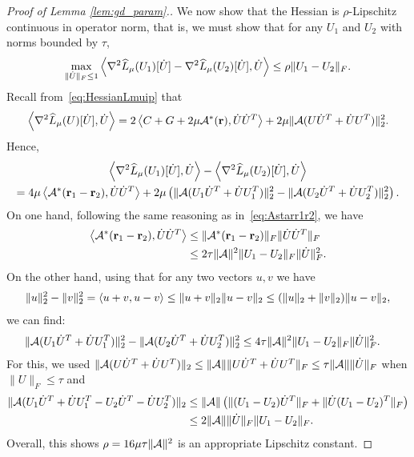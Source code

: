 \begin{proof}[Proof of Lemma \ref{lem:gd_param}.]
We now show that the Hessian is $\rho$-Lipschitz continuous in operator norm, that is, we must show that for any $U_1$ and $U_2$ with norms bounded by $\tau$,
\begin{align*}
	\underset{\|{\dot U}\|_F \leq 1}{\max}\left\langle \nabla^2 {\widehat L_\mu}(U_1)[{\dot U}] -\nabla^2 {\widehat L_\mu}(U_2)[{\dot U}], {\dot U} \right\rangle \leq \rho \|U_1 -U_2\|_F.
\end{align*}
Recall from~\eqref{eq:HessianLmuip} that
\begin{align*}
	\left\langle \nabla^2 {\widehat L_\mu}(U)[{\dot U}], {\dot U} \right\rangle = 2\left\langle C+G+2\mu \mathcal{A}^*(\mathbf{r}), {\dot U}{\dot U}^T \right\rangle + 2\mu \|\mathcal{A}(U{\dot U}^T+{\dot U}U^T)\|_2^2.
\end{align*}
Hence,
\begin{multline*}
	\left\langle \nabla^2 {\widehat L_\mu}(U_1)[{\dot U}], {\dot U} \right\rangle -\left\langle \nabla^2 {\widehat L_\mu}(U_2)[{\dot U}], {\dot U} \right\rangle  \\
 = 4\mu\left\langle \mathcal{A}^*(\mathbf{r}_1 - \mathbf{r}_2), {\dot U}{\dot U}^T \right\rangle +  2\mu \left(\|\mathcal{A}(U_1{\dot U}^T+{\dot U}U_1^T)\|_2^2 - \|\mathcal{A}(U_2{\dot U}^T+{\dot U}U_2^T)\|_2^2\right).
\end{multline*}
On one hand, following the same reasoning as in~\eqref{eq:Astarr1r2}, we have
\begin{align*}
	\left\langle \mathcal{A}^*(\mathbf{r}_1 - \mathbf{r}_2), {\dot U}{\dot U}^T \right\rangle & \leq \|\mathcal{A}^*(\mathbf{r}_1 - \mathbf{r}_2)\|_F \|{\dot U}{\dot U}^T\|_F \\
	& \leq 2\tau \|\mathcal{A}\|^2 \|U_1 - U_2\|_F \|\dot U\|_F^2.
\end{align*}
On the other hand, using that for any two vectors $u, v$ we have
\begin{align*}
	\|u\|_2^2 - \|v\|_2^2 = \left\langle u+v, u-v \right\rangle \leq \|u+v\|_2 \|u-v\|_2 \leq (\|u\|_2 + \|v\|_2)\|u - v\|_2,
\end{align*}
we can find:
\begin{align*}
\|\mathcal{A}(U_1{\dot U}^T+{\dot U}U_1^T)\|_2^2 - \|\mathcal{A}(U_2{\dot U}^T+{\dot U}U_2^T)\|_2^2 & \leq 4 \tau \|\mathcal{A}\|^2 \|U_1 - U_2\|_F \|\dot U\|_F^2.
\end{align*}
For this, we used $\|\mathcal{A}(U\dot U^T + \dot U U^T)\|_2 \leq \|\mathcal{A}\| \|U\dot U^T + \dot U U^T\|_F \leq \tau \|\mathcal{A}\|\|\dot U\|_F$ when $\|U\|_F \leq \tau$ and 
\begin{align*}
	\|\mathcal{A}(U_1{\dot U}^T+{\dot U}U_1^T - U_2{\dot U}^T - {\dot U}U_2^T)\|_2
	 & \leq \|\mathcal{A}\| \left( \|(U_1-U_2)\dot U^T\|_F + \|\dot U(U_1-U_2)^T\|_F \right) \\
	 & \leq 2\|\mathcal{A}\|\|\dot U\|_F \|U_1 - U_2\|_F.
\end{align*}
Overall, this shows $\rho = 16\mu \tau \|\mathcal{A}\|^2$ is an appropriate Lipschitz constant.
\end{proof}
